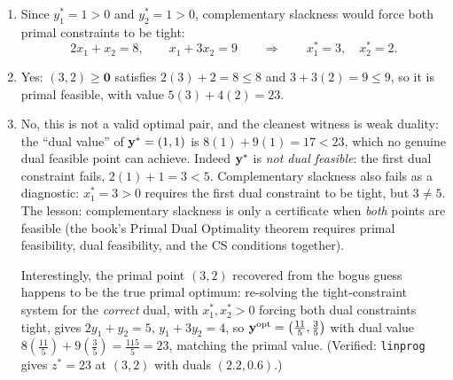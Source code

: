 \begin{enumerate}
\item[(a)] Since $y_1^* = 1 > 0$ and $y_2^* = 1 > 0$, complementary slackness would force both primal constraints to be tight:
\[
2x_1 + x_2 = 8, \qquad x_1 + 3x_2 = 9
\qquad\Longrightarrow\qquad
x_1^* = 3, \quad x_2^* = 2 .
\]
\item[(b)] Yes: $(3, 2) \ge \mathbf{0}$ satisfies $2(3) + 2 = 8 \le 8$ and $3 + 3(2) = 9 \le 9$, so it is primal feasible, with value $5(3) + 4(2) = 23$.
\item[(c)] No, this is not a valid optimal pair, and the cleanest witness is weak duality: the ``dual value'' of $\mathbf{y}^* = (1,1)$ is $8(1) + 9(1) = 17 < 23$, which no genuine dual feasible point can achieve. Indeed $\mathbf{y}^*$ is \emph{not dual feasible}: the first dual constraint fails, $2(1) + 1 = 3 < 5$. Complementary slackness also fails as a diagnostic: $x_1^* = 3 > 0$ requires the first dual constraint to be tight, but $3 \neq 5$. The lesson: complementary slackness is only a certificate when \emph{both} points are feasible (the book's Primal Dual Optimality theorem requires primal feasibility, dual feasibility, and the CS conditions together).

Interestingly, the primal point $(3, 2)$ recovered from the bogus guess happens to be the true primal optimum: re-solving the tight-constraint system for the \emph{correct} dual, with $x_1^*, x_2^* > 0$ forcing both dual constraints tight, gives $2y_1 + y_2 = 5$, $y_1 + 3y_2 = 4$, so $\mathbf{y}^{\text{opt}} = \left(\tfrac{11}{5}, \tfrac{3}{5}\right)$ with dual value $8\left(\tfrac{11}{5}\right) + 9\left(\tfrac{3}{5}\right) = \tfrac{115}{5} = 23$, matching the primal value. (Verified: \texttt{linprog} gives $z^* = 23$ at $(3,2)$ with duals $(2.2, 0.6)$.)
\end{enumerate}


